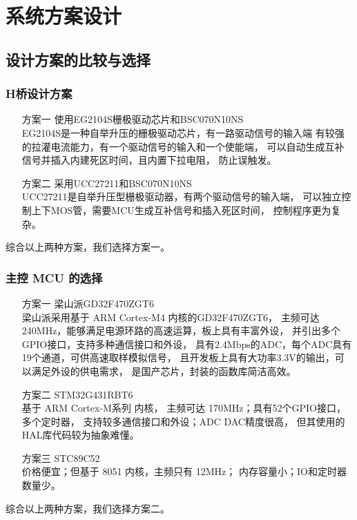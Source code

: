 \documentclass[a4paper,12pt]{article}
\begin{document}
\section{系统方案设计}
\subsection{设计方案的比较与选择}

\subsubsection{H桥设计方案}
\begin{enumerate}
    \item[方案一] 使用EG2104S栅极驱动芯片和BSC070N10NS
    \\ 
    EG2104S是一种自举升压的栅极驱动芯片，有一路驱动信号的输入端
    有较强的拉灌电流能力，有一个驱动信号的输入和一个使能端，
    可以自动生成互补信号并插入内建死区时间，且内置下拉电阻，
    防止误触发。
    \item[方案二] 采用UCC27211和BSC070N10NS
    \\ 
    UCC27211是自举升压型栅极驱动器，有两个驱动信号的输入端，
    可以独立控制上下MOS管，需要MCU生成互补信号和插入死区时间，
    控制程序更为复杂。
\end{enumerate}
综合以上两种方案，我们选择方案一。

\subsubsection{主控 MCU 的选择}
\begin{enumerate}
    \item[方案一] 梁山派GD32F470ZGT6 
    \\
    梁山派采用基于 ARM Cortex-M4 内核的GD32F470ZGT6，
    主频可达240MHz，能够满足电源环路的高速运算，板上具有丰富外设，
    并引出多个GPIO接口，支持多种通信接口和外设，
    具有2.4Mbps的ADC，每个ADC具有19个通道，可供高速取样模拟信号，
    且开发板上具有大功率3.3V的输出，可以满足外设的供电需求，
    是国产芯片，封装的函数库简洁高效。
    \item[方案二] STM32G431RBT6 
    \\ 
    基于 ARM Cortex-M系列 内核，
    主频可达 170MHz；具有52个GPIO接口，多个定时器，
    支持较多通信接口和外设；ADC DAC精度很高，
    但其使用的HAL库代码较为抽象难懂。    
    \item[方案三] STC89C52 
    \\ 
    价格便宜；但基于 8051 内核，主频只有 12MHz；
    内存容量小；IO和定时器数量少。
\end{enumerate}
综合以上两种方案，我们选择方案二。
\end{document}
